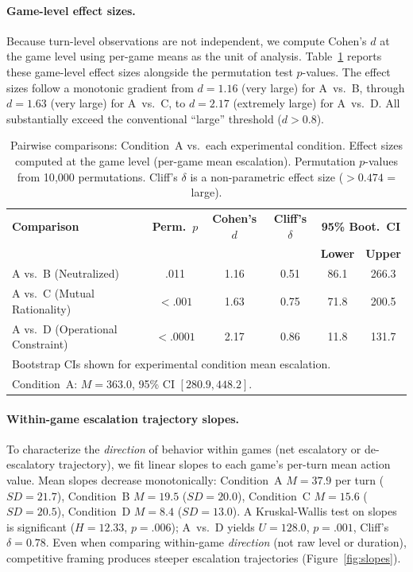 \documentclass[manuscript, review=true, anonymous=true]{acmart}
\begin{document}
\paragraph{Game-level effect sizes.}
Because turn-level observations are not independent, we compute Cohen's $d$ at the game level using per-game means as the unit of analysis.
Table~\ref{tab:pairwise} reports these game-level effect sizes alongside the permutation test $p$-values.
The effect sizes follow a monotonic gradient from $d = 1.16$ (very large) for A~vs.~B, through $d = 1.63$ (very large) for A~vs.~C, to $d = 2.17$ (extremely large) for A~vs.~D.
All substantially exceed the conventional ``large'' threshold ($d > 0.8$).

\begin{table}[tbp]
\centering
\caption{Pairwise comparisons: Condition~A vs.\ each experimental condition. Effect sizes computed at the game level (per-game mean escalation). Permutation $p$-values from 10{,}000 permutations. Cliff's $\delta$ is a non-parametric effect size ($> 0.474$ = large).}
\label{tab:pairwise}
\small
\begin{tabular}{lccccc}
\toprule
\textbf{Comparison} & \textbf{Perm.\ $p$} & \textbf{Cohen's $d$} & \textbf{Cliff's $\delta$} & \multicolumn{2}{c}{\textbf{95\% Boot.\ CI}} \\
 & & & & \textbf{Lower} & \textbf{Upper} \\
\midrule
A vs.\ B (Neutralized)             & .011   & 1.16 & 0.51 & 86.1  & 266.3 \\
A vs.\ C (Mutual Rationality)      & ${<}.001$ & 1.63 & 0.75 & 71.8  & 200.5 \\
A vs.\ D (Operational Constraint)  & ${<}.0001$ & 2.17 & 0.86 & 11.8  & 131.7 \\
\midrule
\multicolumn{6}{l}{\footnotesize Bootstrap CIs shown for experimental condition mean escalation.} \\
\multicolumn{6}{l}{\footnotesize Condition~A: $M = 363.0$, 95\% CI $[280.9, 448.2]$.} \\
\bottomrule
\end{tabular}
\end{table}

\paragraph{Within-game escalation trajectory slopes.}
To characterize the \emph{direction} of behavior within games (net escalatory or de-escalatory trajectory), we fit linear slopes to each game's per-turn mean action value.
Mean slopes decrease monotonically: Condition~A $M = 37.9$ per turn ($SD = 21.7$), Condition~B $M = 19.5$ ($SD = 20.0$), Condition~C $M = 15.6$ ($SD = 20.5$), Condition~D $M = 8.4$ ($SD = 13.0$).
A Kruskal-Wallis test on slopes is significant ($H = 12.33$, $p = .006$); A~vs.~D yields $U = 128.0$, $p = .001$, Cliff's $\delta = 0.78$.
Even when comparing within-game \emph{direction} (not raw level or duration), competitive framing produces steeper escalation trajectories (Figure~\ref{fig:slopes}).
\end{document}
